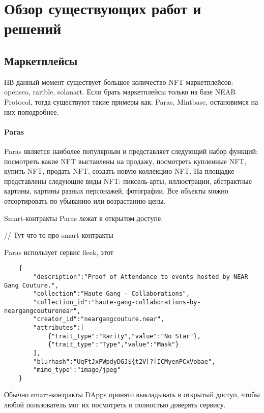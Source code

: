 \section{Обзор существующих работ и решений}
\label{section.3}
\subsection{Маркетплейсы}
НВ данный момент существует большое количество NFT маркетплейсов: opensea\cite{opensea}, rarible\cite{rarible}, solanart\cite{solanart}. Если брать маркетплейсы только на базе NEAR Protocol, тогда существуют такие примеры как: Paras\cite{paras}, Mintbase\cite{mintbase}, остановимся на них поподробнее.

\paragraph{Paras}

Paras является наиболее популярным и представляет следующий набор функций:
посмотреть какие NFT выставлены на продажу, посмотреть купленные NFT, купить NFT, продать NFT, создать новую коллекцию NFT.
На площадке представлены следующие виды NFT: пиксель-арты, иллюстрации, абстрактные картины, картины разных персонажей, фотографии. Все объекты можно отсортировать по убыванию или возрастанию цены.

Smart-контракты Paras лежат в открытом доступе\cite{parasnftcontract, parasmarketplacecontract}.

// Тут что-то про smart-контракты

Paras использует сервис fleek, этот 

\begin{verbatim}
    {
        "description":"Proof of Attendance to events hosted by NEAR Gang Couture.",
        "collection":"Haute Gang - Collaborations",
        "collection_id":"haute-gang-collaborations-by-neargangcouturenear",
        "creator_id":"neargangcouture.near",
        "attributes":[
            {"trait_type":"Rarity","value":"No Star"},
            {"trait_type":"Type","value":"Mask"}
        ],
        "blurhash":"UqFtJxPWpdyDGJ${t2V[?[ICMyenPCxVobae",
        "mime_type":"image/jpeg"
    }
\end{verbatim}

\begin{remark}
    Обычно smart-контракты DApps принято выкладывать в открытый доступ, чтобы любой пользователь мог их посмотреть и полностью доверять сервису.
\end{remark}


